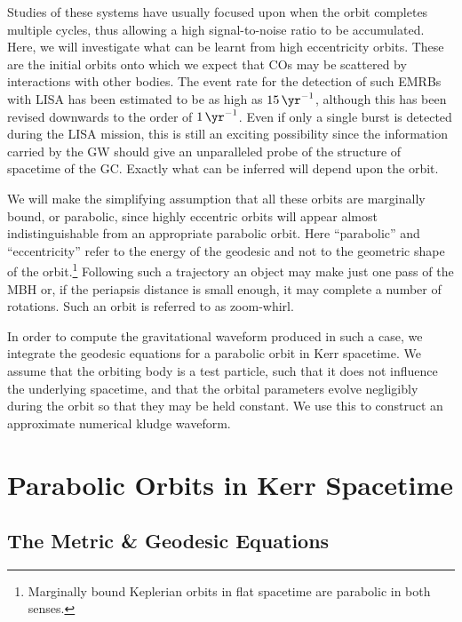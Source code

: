 Studies of these systems have usually focused upon when the orbit completes multiple cycles, thus allowing a high signal-to-noise ratio to be accumulated. Here, we will investigate what can be learnt from high eccentricity orbits. These are the initial orbits onto which we expect that COs may be scattered by interactions with other bodies. The event rate for the detection of such EMRBs with LISA has been estimated to be as high as $\SI{15}{\yr^{-1}}$\cite{Rubbo2006}, although this has been revised downwards to the order of $\SI{1}{\yr^{-1}}$\cite{Hopman2007}. Even if only a single burst is detected during the LISA mission, this is still an exciting possibility since the information carried by the GW should give an unparalleled probe of the structure of spacetime of the GC. Exactly what can be inferred will depend upon the orbit.

We will make the simplifying assumption that all these orbits are marginally bound, or parabolic, since highly eccentric orbits will appear almost indistinguishable from an appropriate parabolic orbit\cite{Kobayashi2004}. Here ``parabolic'' and ``eccentricity'' refer to the energy of the geodesic and not to the geometric shape of the orbit.\footnote{Marginally bound Keplerian orbits in flat spacetime are parabolic in both senses.} Following such a trajectory an object may make just one pass of the MBH or, if the periapsis distance is small enough, it may complete a number of rotations. Such an orbit is referred to as zoom-whirl.

In order to compute the gravitational waveform produced in such a case, we integrate the geodesic equations for a parabolic orbit in Kerr spacetime. We assume that the orbiting body is a test particle, such that it does not influence the underlying spacetime, and that the orbital parameters evolve negligibly during the orbit so that they may be held constant. We use this to construct an approximate numerical kludge waveform\cite{Babak2007}.

\section{Parabolic Orbits in Kerr Spacetime}

\subsection{The Metric \& Geodesic Equations}

